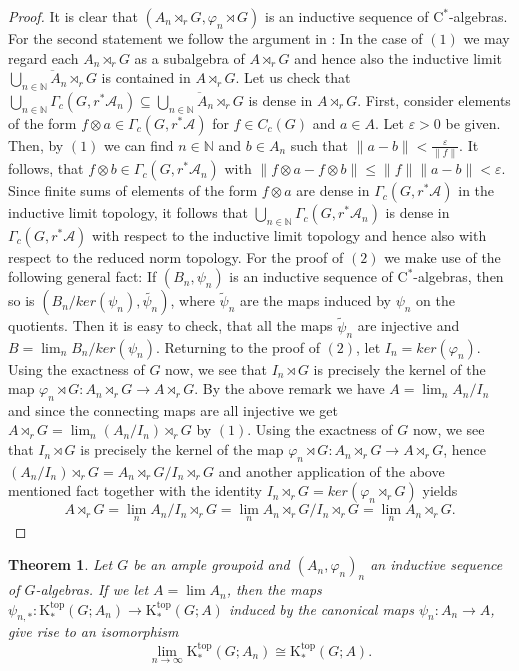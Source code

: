 \documentclass[reqno,oneside,a4paper,11pt]{amsart}
\theoremstyle{theorem}
\newtheorem{satz}{Theorem}[section]
\theoremstyle{definition}
\newcommand{\norm}[1]{\lVert#1\rVert}   %
\newcommand{\K}{\mathrm K}
\newcommand{\NN}{\mathbb N}
\begin{document}
	\begin{proof}
		It is clear that $(A_n\rtimes_r G,\varphi_n\rtimes G)$ is an inductive sequence of $\mathrm{C}^*$-algebras. For the second statement we follow the argument in \cite[Lemma~2.5]{MR2010742}:
		In the case of $(1)$ we may regard each $A_n\rtimes_r G$ as a subalgebra of $A\rtimes_r G$ and hence also the inductive limit $\overline{\bigcup_{n\in\NN}A_n\rtimes_r G}$ is contained in $A\rtimes_r G$. Let us check that $\bigcup_{n\in\NN} \Gamma_c(G,r^*\mathcal{A}_n)\subseteq \overline{\bigcup_{n\in\NN}A_n\rtimes_r G}$ is dense in $A\rtimes_r G$. First, consider elements of the form $f\otimes a\in \Gamma_c(G,r^*\mathcal{A})$ for $f\in C_c(G)$ and $a\in A$. Let $\varepsilon>0$ be given. Then, by $(1)$ we can find $n\in\NN$ and $b\in A_n$ such that $\norm{a-b}<\frac{\varepsilon}{\norm{f}}$. It follows, that $f\otimes b\in \Gamma_c(G,r^*\mathcal{A}_n)$ with $\norm{f\otimes a-f\otimes b}\leq \norm{f}\norm{a-b}<\varepsilon$. Since finite sums of elements of the form $f\otimes a$ are dense in $\Gamma_c(G,r^*\mathcal{A})$ in the inductive limit topology, it follows that $\bigcup_{n\in\NN}\Gamma_c(G,r^*\mathcal{A}_n)$ is dense in $\Gamma_c(G,r^*\mathcal{A})$ with respect to the inductive limit topology and hence also with respect to the reduced norm topology.
		For the proof of $(2)$ we make use of the following general fact:
		If $(B_n,\psi_n)$ is an inductive sequence of $\mathrm{C}^*$-algebras, then so is $(B_n/ker(\psi_n),\widetilde{\psi_n})$, where $\widetilde{\psi}_n$ are the maps induced by $\psi_n$ on the quotients. Then it is easy to check, that all the maps $\widetilde{\psi}_n$ are injective and $B=\lim_n B_n/ker(\psi_n)$.
		Returning to the proof of $(2)$,
		let $I_n=ker(\varphi_n)$. Using the exactness of $G$ now, we see that $I_n\rtimes G$ is precisely the kernel of the map $\varphi_n \rtimes G:A_n\rtimes_r G\rightarrow A\rtimes_r G$.
		By the above remark we have $A=\lim_n A_n/I_n$ and since the connecting maps are all injective we get $A\rtimes_r G=\lim_n (A_n/I_n)\rtimes_r G$ by $(1)$. Using the exactness of $G$ now, we see that $I_n\rtimes G$ is precisely the kernel of the map $\varphi_n \rtimes G:A_n\rtimes_r G\rightarrow A\rtimes_r G$, hence $(A_n/I_n)\rtimes_r G=A_n\rtimes_r G/I_n\rtimes_r G$ and another application of the above mentioned fact together with the identity $I_n\rtimes_r G=ker(\varphi_n\rtimes_r G)$ yields
		$$A\rtimes_r G	=\lim_n A_n/I_n\rtimes_r G=\lim_n A_n\rtimes_r G/I_n\rtimes_r G=\lim_n A_n\rtimes_r G.$$
	\end{proof}
	\begin{satz}\label{Theorem:Continuity of top. K-theory}
		Let $G$ be an ample groupoid and $(A_n,\varphi_n)_n$ an inductive sequence of $G$-algebras. If we let $A=\lim A_n$, then the maps $\psi_{n,*}:\K_*^{\mathrm{top}}(G;A_n)\rightarrow \K_*^{\mathrm{top}}(G;A)$ induced by the canonical maps $\psi_n:A_n\rightarrow A$, give rise to an isomorphism
		$$\lim_{n\rightarrow\infty}\K_*^{\mathrm{top}}(G;A_n)\cong \K_*^{\mathrm{top}}(G;A).$$
	\end{satz}
\end{document}
